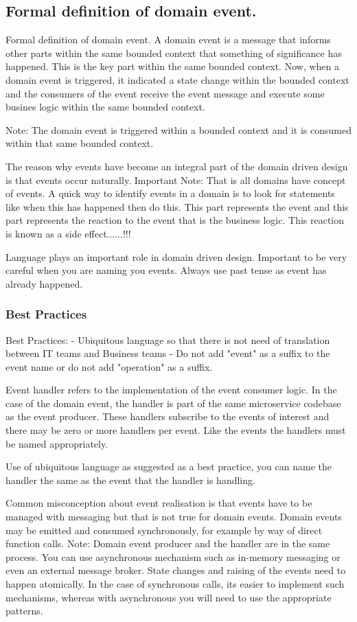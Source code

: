\subsection{Formal definition of domain event.}
Formal definition of domain event.
A domain event is a message that informs other parts within the same bounded context that something of significance has happened.
This is the key part within the same bounded context.
Now, when a domain event is triggered, it indicated a state change within the bounded context and the consumers of the event receive the event message and execute some busines logic within the same bounded context.
\begin{note}
    Note: The domain event is triggered within a bounded context and it is consumed within that same bounded context.
\end{note}
The reason why events have become an integral part of the domain driven design is that events occur naturally.
Important Note: That is all domains have concept of events.
A quick way to identify events in a domain is to look for statements like when this has happened then do this.
This part represents the event and this part represents the reaction to the event that is the business logic.
This reaction is known as a side effect......!!!

Language plays an important role in domain driven design.
Important to be very careful when you are naming you events.
Always use past tense as event has already happened.

\subsubsection{Best Practices}
Best Practices:
- Ubiquitous language so that there is not need of translation between IT teams and Business teams
- Do not add "event" as a suffix to the event name or do not add "operation" as a suffix.

Event handler refers to the implementation of the event consumer logic.
In the case of the domain event, the handler is part of the same microservice codebase as the event producer.
These handlers subscribe to the events of interest and there may be zero or more handlers per event.
Like the events the handlers must be named appropriately.

Use of ubiquitous language as suggested as a best practice, you can name the handler the same as the event that the handler is handling.

Common misconception about event realisation is that events have to be managed with messaging but that is not true for domain events.
Domain events may be emitted and consumed synchronously, for example by way of direct function calls.
Note: Domain event producer and the handler are in the same process.
You can use asynchronous mechanism such as in-memory messaging or even an external message broker.
State changes and raising of the events need to happen atomically.
In the case of synchronous calls, its easier to implement such mechanisms, whereas with asynchronous you will need to use the appropriate patterns.

